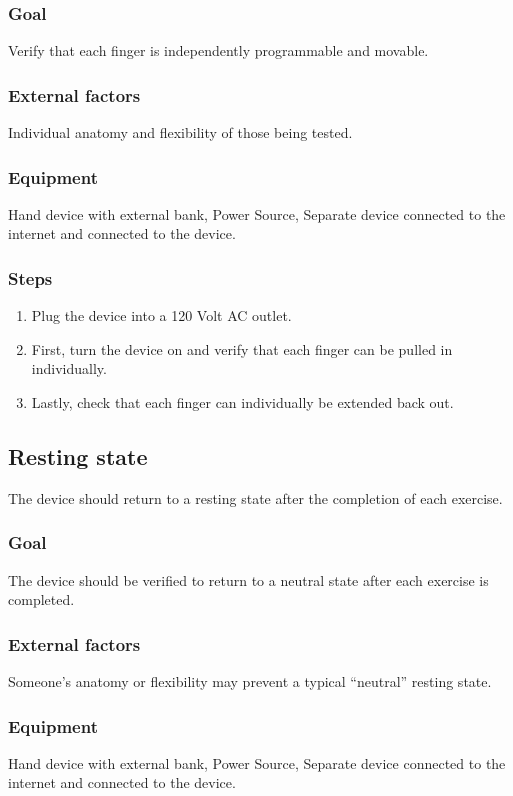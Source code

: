 \documentclass{article}
\begin{document}
\subsubsection{Goal} Verify that each finger is independently programmable and movable.

\subsubsection{External factors} Individual anatomy and flexibility of those being tested.

\subsubsection{Equipment} Hand device with external bank, Power Source, Separate device connected to the internet and connected to the device.

\subsubsection{Steps}
\begin{enumerate}
\item Plug the device into a 120 Volt AC outlet.
\item First, turn the device on and verify that each finger can be pulled in individually.
\item Lastly, check that each finger can individually be extended back out.
\end{enumerate}

\subsection{Resting state}
The device should return to a resting state after the completion of each exercise.

\subsubsection{Goal} The device should be verified to return to a neutral state after each exercise is completed.

\subsubsection{External factors} Someone’s anatomy or flexibility may prevent a typical “neutral” resting state.

\subsubsection{Equipment} Hand device with external bank, Power Source, Separate device connected to the internet and connected to the device.
\end{document}

